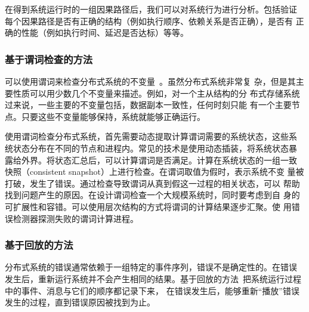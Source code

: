 在得到系统运行时的一组因果路径后，我们可以对系统行为进行分析。包括验证
每个因果路径是否有正确的结构（例如执行顺序、依赖关系是否正确），是否有
正确的性能（例如执行时间、延迟是否达标）等等。

% 


\subsubsection*{基于谓词检查的方法}

可以使用谓词来检查分布式系统的不变量~\cite{d3s}。虽然分布式系统非常复
杂，但是其主要性质可以用少数几个不变量来描述。例如，对一个主从结构的分
布式存储系统过来说，一些主要的不变量包括，数据副本一致性，任何时刻只能
有一个主要节点。只要这些不变量能够保持，系统就能够正确运行。

使用谓词检查分布式系统，首先需要动态提取计算谓词需要的系统状态，这些系
统状态分布在不同的节点和进程内。常见的技术是使用动态插装，将系统状态暴
露给外界。将状态汇总后，可以计算谓词是否满足。计算在系统状态的一组一致
快照（consistent snapshot）上进行检查。在谓词取值为假时，表示系统不变
量被打破，发生了错误。通过检查导致谓词从真到假这一过程的相关状态，可以
帮助找到问题产生的原因。在设计谓词检查一个大规模系统时，同时要考虑到自
身的可扩展性和容错。可以使用层次结构的方式将谓词的计算结果逐步汇聚。使
用错误检测器探测失败的谓词计算进程。

\subsubsection*{基于回放的方法}

分布式系统的错误通常依赖于一组特定的事件序列，错误不是确定性的。在错误
发生后，重新运行系统并不会产生相同的结果。基于回放的方法~\cite{liblog,
friday, r2, mpiwiz}把系统运行过程中的事件、消息与它们的顺序都记录下来，
在错误发生后，能够重新“播放”错误发生的过程，直到错误原因被找到为止。

